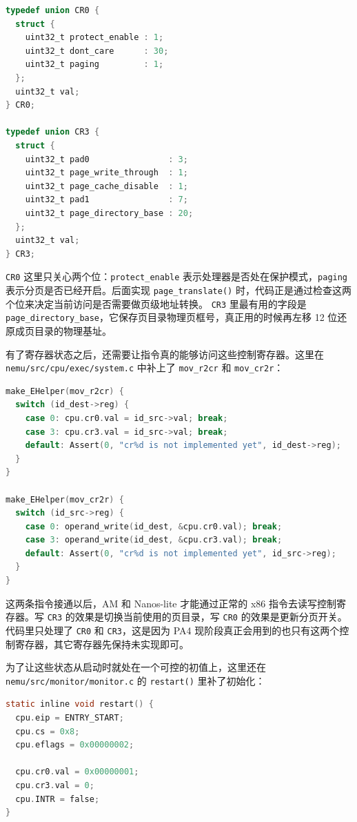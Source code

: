 \documentclass[a4paper]{article}
\begin{document}
\begin{lstlisting}[language=C]
typedef union CR0 {
  struct {
    uint32_t protect_enable : 1;
    uint32_t dont_care      : 30;
    uint32_t paging         : 1;
  };
  uint32_t val;
} CR0;

typedef union CR3 {
  struct {
    uint32_t pad0                : 3;
    uint32_t page_write_through  : 1;
    uint32_t page_cache_disable  : 1;
    uint32_t pad1                : 7;
    uint32_t page_directory_base : 20;
  };
  uint32_t val;
} CR3;
\end{lstlisting}

\texttt{CR0} 这里只关心两个位：\texttt{protect\_enable} 表示处理器是否处在保护模式，\texttt{paging} 表示分页是否已经开启。后面实现 \texttt{page\_translate()} 时，代码正是通过检查这两个位来决定当前访问是否需要做页级地址转换。 \texttt{CR3} 里最有用的字段是 \texttt{page\_directory\_base}，它保存页目录物理页框号，真正用的时候再左移 12 位还原成页目录的物理基址。

有了寄存器状态之后，还需要让指令真的能够访问这些控制寄存器。这里在 \texttt{nemu/src/cpu/exec/system.c} 中补上了 \texttt{mov\_r2cr} 和 \texttt{mov\_cr2r}：

\begin{lstlisting}[language=C]
make_EHelper(mov_r2cr) {
  switch (id_dest->reg) {
    case 0: cpu.cr0.val = id_src->val; break;
    case 3: cpu.cr3.val = id_src->val; break;
    default: Assert(0, "cr%d is not implemented yet", id_dest->reg);
  }
}

make_EHelper(mov_cr2r) {
  switch (id_src->reg) {
    case 0: operand_write(id_dest, &cpu.cr0.val); break;
    case 3: operand_write(id_dest, &cpu.cr3.val); break;
    default: Assert(0, "cr%d is not implemented yet", id_src->reg);
  }
}
\end{lstlisting}

这两条指令接通以后，AM 和 Nanos-lite 才能通过正常的 x86 指令去读写控制寄存器。写 \texttt{CR3} 的效果是切换当前使用的页目录，写 \texttt{CR0} 的效果是更新分页开关。代码里只处理了 \texttt{CR0} 和 \texttt{CR3}，这是因为 PA4 现阶段真正会用到的也只有这两个控制寄存器，其它寄存器先保持未实现即可。

为了让这些状态从启动时就处在一个可控的初值上，这里还在 \texttt{nemu/src/monitor/monitor.c} 的 \texttt{restart()} 里补了初始化：

\begin{lstlisting}[language=C]
static inline void restart() {
  cpu.eip = ENTRY_START;
  cpu.cs = 0x8;
  cpu.eflags = 0x00000002;

  cpu.cr0.val = 0x00000001;
  cpu.cr3.val = 0;
  cpu.INTR = false;
}
\end{lstlisting}
\end{document}
